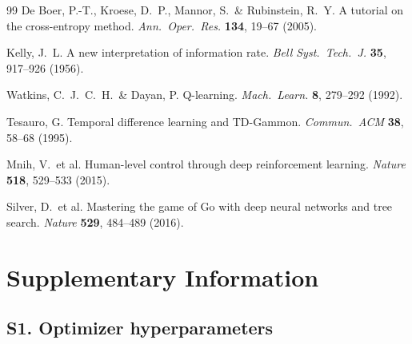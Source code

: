 \documentclass[12pt]{article}
\begin{document}
\begin{thebibliography}{99}
De Boer, P.-T., Kroese, D.\ P., Mannor, S.\ \& Rubinstein, R.\ Y.
A tutorial on the cross-entropy method.
\textit{Ann.\ Oper.\ Res.} \textbf{134}, 19--67 (2005).

Kelly, J.\ L.
A new interpretation of information rate.
\textit{Bell Syst.\ Tech.\ J.} \textbf{35}, 917--926 (1956).

Watkins, C.\ J.\ C.\ H.\ \& Dayan, P.
Q-learning.
\textit{Mach.\ Learn.} \textbf{8}, 279--292 (1992).

Tesauro, G.
Temporal difference learning and TD-Gammon.
\textit{Commun.\ ACM} \textbf{38}, 58--68 (1995).

Mnih, V.\ et al.
Human-level control through deep reinforcement learning.
\textit{Nature} \textbf{518}, 529--533 (2015).

Silver, D.\ et al.
Mastering the game of Go with deep neural networks and tree search.
\textit{Nature} \textbf{529}, 484--489 (2016).

\end{thebibliography}

\clearpage
\appendix
\section*{Supplementary Information}

\subsection*{S1. Optimizer hyperparameters}
\end{document}
